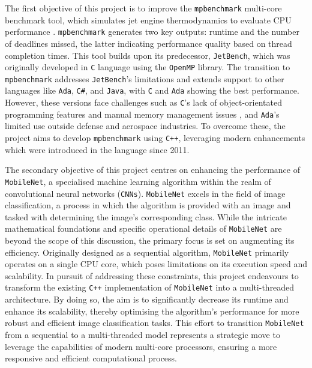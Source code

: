 \documentclass[12pt, openany]{book}
\begin{document}
The first objective of this project is to improve the \texttt{mpbenchmark} multi-core benchmark tool, which simulates jet engine thermodynamics to evaluate CPU performance \cite{mpbenchmark_paper}. \texttt{mpbenchmark} generates two key outputs: runtime and the number of deadlines missed, the latter indicating performance quality based on thread completion times. This tool builds upon its predecessor, \texttt{JetBench}, which was originally developed in \texttt{C} language using the \texttt{OpenMP} library\cite{JetBench_paper}. The transition to \texttt{mpbenchmark} addresses \texttt{JetBench}'s limitations and extends support to other languages like \texttt{Ada}, \texttt{C\#}, and \texttt{Java}, with \texttt{C} and \texttt{Ada} showing the best performance. However, these versions face challenges such as \texttt{C}'s lack of object-orientated programming features and manual memory management issues \cite{c_language_drawbacks}, and \texttt{Ada}'s limited use outside defense and aerospace industries\cite{ada_langauge_uses}. To overcome these, the project aims to develop \texttt{mpbenchmark} using \texttt{C++}, leveraging modern enhancements which were introduced in the language since 2011\cite{evolution_of_C++}.

The secondary objective of this project centres on enhancing the performance of \texttt{MobileNet}, a specialised machine learning algorithm within the realm of convolutional neural networks (\texttt{CNNs})\cite{mobilenet_paper}. \texttt{MobileNet} excels in the field of image classification, a process in which the algorithm is provided with an image and tasked with determining the image's corresponding class. While the intricate mathematical foundations and specific operational details of \texttt{MobileNet} are beyond the scope of this discussion, the primary focus is set on augmenting its efficiency. Originally designed as a sequential algorithm, \texttt{MobileNet} primarily operates on a single CPU core, which poses limitations on its execution speed and scalability. In pursuit of addressing these constraints, this project endeavours to transform the existing \texttt{C++} implementation of \texttt{MobileNet}\cite{mobilenet_repo} into a multi-threaded architecture. By doing so, the aim is to significantly decrease its runtime and enhance its scalability, thereby optimising the algorithm's performance for more robust and efficient image classification tasks. This effort to transition \texttt{MobileNet} from a sequential to a multi-threaded model represents a strategic move to leverage the capabilities of modern multi-core processors, ensuring a more responsive and efficient computational process.
\end{document}
